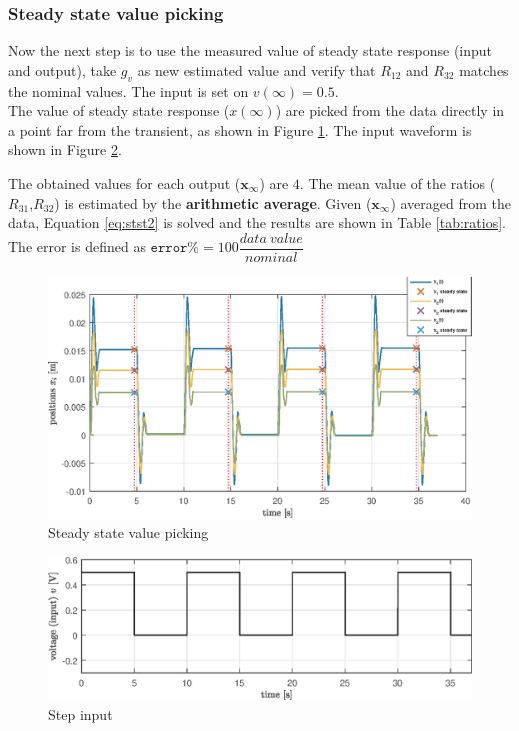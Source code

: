 \documentclass[twosided,a4paper]{article}           %
\begin{document}
\subsubsection{Steady state value picking}
Now the next step is to use the measured value of steady state response (input and output), take $g_v$ as new estimated value and verify that $R_{12}$ and $R_{32}$ matches the nominal values. The input is set on $v(\infty) = 0.5$.\\
The value of steady state response ($x(\infty)$) are picked from the data directly in a point far from the transient,  as shown in Figure \ref{fig:stst1}. The input waveform is shown in Figure \ref{fig:step_input}.\par
The obtained values for each output ($\bm x_{\infty}$) are $4$. The mean value of the ratios ($R_{31}$,$R_{32}$) is estimated by the \textbf{arithmetic average}. Given ($ \bm x_{\infty}$) averaged from the data, Equation \eqref{eq:stst2} is solved and the results are shown in Table \ref{tab:ratios}. The error is defined as $\texttt{error}\% = 100\dfrac{data \ value}{nominal}$
\begin{figure}[H]
	\centering
	\includegraphics[width=\linewidth]{img/stst1}
	\caption[steady state value picking]{Steady state value picking}
	\label{fig:stst1}
\end{figure}
\begin{figure}[H]
	\centering
	\includegraphics[width=\linewidth]{img/step_input}
	\caption{Step input}
	\label{fig:step_input}
\end{figure}
\noindent
\end{document}
